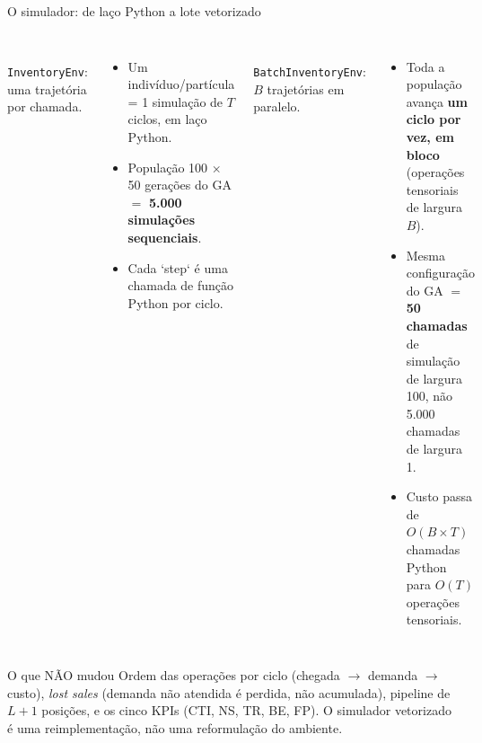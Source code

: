 \begin{frame}{O simulador: de laço Python a lote vetorizado}
  \begin{columns}[T,onlytextwidth]
      \antes\\[0.3em]
      \small \texttt{InventoryEnv}: uma trajetória por chamada.
      \begin{itemize}\footnotesize
        \item Um indivíduo/partícula = 1 simulação de $T$ ciclos, em laço Python.
        \item População 100 $\times$ 50 gerações do GA $=$ \textbf{5.000
          simulações sequenciais}.
        \item Cada `step` é uma chamada de função Python por ciclo.
      \end{itemize}
      \depois\\[0.3em]
      \small \texttt{BatchInventoryEnv}: $B$ trajetórias em paralelo.
      \begin{itemize}\footnotesize
        \item Toda a população avança \textbf{um ciclo por vez, em bloco}
          (operações tensoriais de largura $B$).
        \item Mesma configuração do GA $=$ \textbf{50 chamadas} de simulação
          de largura 100, não 5.000 chamadas de largura 1.
        \item Custo passa de $O(B\times T)$ chamadas Python para $O(T)$
          operações tensoriais.
      \end{itemize}
  \end{columns}
  \vspace{0.8em}

  \begin{block}{O que NÃO mudou}
    \small Ordem das operações por ciclo (chegada $\to$ demanda $\to$
    custo), \textit{lost sales} (demanda não atendida é perdida, não
    acumulada), pipeline de $L{+}1$ posições, e os cinco KPIs (CTI, NS,
    TR, BE, FP). O simulador vetorizado é uma reimplementação, não uma
    reformulação do ambiente.
  \end{block}

\end{frame}
